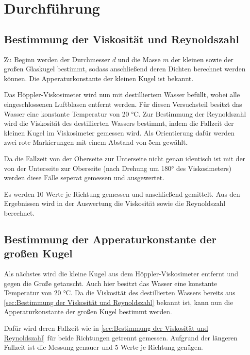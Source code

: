 \section{Durchführung}
\label{sec:Durchführung}

\subsection{Bestimmung der Viskosität und Reynoldszahl}
\label{sec:Bestimmung der Viskosität und Reynoldszahl}

Zu Beginn werden der Durchmesser $d$ und die Masse $m$ der kleinen sowie der großen Glaskugel bestimmt,
sodass anschließend deren Dichten berechnet werden können. Die Apperaturkonstante der kleinen Kugel ist bekannt.

Das Höppler-Viskosimeter wird nun mit destilliertem Wasser befüllt, wobei alle eingeschlossenen Luftblasen entfernt werden.
Für diesen Versuchsteil besitzt das Wasser eine konstante Temperatur von 20 °C.
Zur Bestimmung der Reynoldszahl wird die Viskosität des destillierten Wassers bestimmt, indem
die Fallzeit der kleinen Kugel im Viskosimeter gemessen wird. Als Orientierung dafür werden zwei rote 
Markierungen mit einem Abstand von 5cm gewählt.

Da die Fallzeit von der Oberseite zur Unterseite nicht genau identisch ist mit der von der Unterseite zur Oberseite
(nach Drehung um 180° des Viskosimeters) werden diese Fälle seperat gemessen und ausgewertet.

Es werden 10 Werte je Richtung gemessen und anschließend gemittelt. Aus den Ergebnissen wird in der Auswertung die Viskosität
sowie die Reynoldszahl berechnet.

\subsection{Bestimmung der Apperaturkonstante der großen Kugel}
\label{sec:Bestimmung der Apperaturkonstante der großen Kugel}
Als nächstes wird die kleine Kugel aus dem Höppler-Viskosimeter entfernt und gegen die Große getauscht.
Auch hier besitzt das Wasser eine konstante Temperatur von 20 °C.
Da die Viskosität des destillierten Wassers bereits aus \autoref{sec:Bestimmung der Viskosität und Reynoldszahl} bekannt ist,
kann nun die Apperaturkonstante der großen Kugel bestimmt werden.

Dafür wird deren Fallzeit wie in \autoref{sec:Bestimmung der Viskosität und Reynoldszahl} für beide Richtungen getrennt gemessen.
Aufgrund der längeren Fallzeit ist die Messung genauer und 5 Werte je Richtung genügen.

